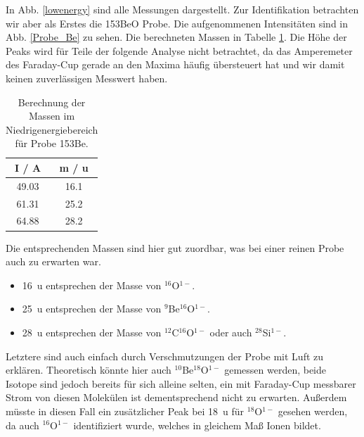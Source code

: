 In Abb. \ref{lowenergy} sind alle Messungen dargestellt.
Zur Identifikation betrachten wir aber als Erstes die 153BeO Probe.
Die aufgenommenen Intensitäten sind in Abb. \ref{Probe_Be} zu sehen.
Die berechneten Massen in Tabelle \ref{153Be}.
Die Höhe der Peaks wird für Teile der folgende Analyse nicht betrachtet, da das Amperemeter des Faraday-Cup gerade an den Maxima häufig übersteuert hat und wir damit keinen zuverlässigen Messwert haben.
\begin{table}[H]
    \centering
    \caption{Berechnung der Massen im Niedrigenergiebereich für Probe 153Be.}
    \begin{tabular}{|c |c|}
        \hline
        I / \si{\ampere} & m / \si{\atomicmassunit} \\
        \hline
        \num{49.03} & \num{16.1} \\
        \num{61.31} & \num{25.2} \\
        \num{64.88} & \num{28.2} \\
        \hline
    \end{tabular}
    \label{153Be}
\end{table}
Die entsprechenden Massen sind hier gut zuordbar, was bei einer reinen Probe auch zu erwarten war.
\begin{itemize}
    \item \SI{16}{\atomicmassunit} entsprechen der Masse von $^{16}$O$^{1-}$.
    \item \SI{25}{\atomicmassunit} entsprechen der Masse von $^{9}$Be$^{16}$O$^{1-}$.
    \item \SI{28}{\atomicmassunit} entsprechen der Masse von $^{12}$C$^{16}$O$^{1-}$ oder auch $^{28}$Si$^{1-}$.
\end{itemize}
Letztere sind auch einfach durch Verschmutzungen der Probe mit Luft zu erklären.
Theoretisch könnte hier auch $^{10}$Be$^{18}$O$^{1-}$ gemessen werden, beide Isotope sind jedoch bereits für sich alleine selten, ein mit Faraday-Cup messbarer Strom von diesen Molekülen ist dementsprechend nicht zu erwarten.
Außerdem müsste in diesen Fall ein zusätzlicher Peak bei \SI{18}{\atomicmassunit} für $^{18}$O$^{1-}$ gesehen werden, da auch $^{16}$O$^{1-}$ identifiziert wurde, welches in gleichem Maß Ionen bildet.
